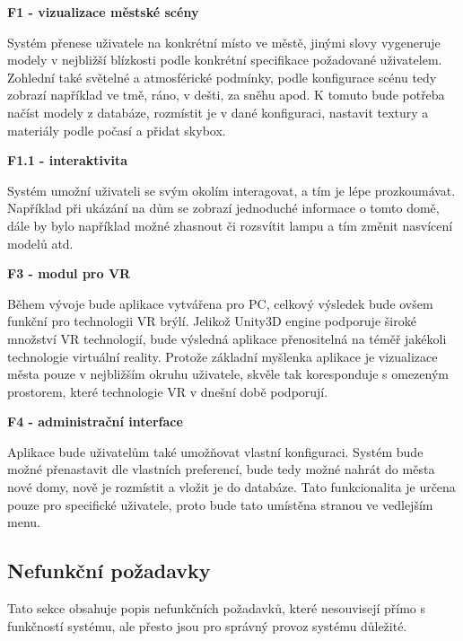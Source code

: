 \documentclass[thesis=B,czech]{FITthesis}[2012/06/26]
\begin{document}
	\begin{description}
	
 		\item \textbf{F1 - vizualizace městské scény}
 		 			
 			Systém přenese uživatele na konkrétní místo ve městě, jinými slovy vygeneruje modely v nejbližší blízkosti podle konkrétní specifikace požadované uživatelem. Zohlední také světelné a atmosférické podmínky, podle konfigurace scénu tedy zobrazí například ve tmě, ráno, v dešti, za sněhu apod. K tomuto bude potřeba načíst modely z databáze, rozmístit je v dané konfiguraci, nastavit textury a materiály podle počasí a přidat skybox.

 		\item \textbf{F1.1 - interaktivita}
 		
 		Systém umožní uživateli se svým okolím interagovat, a tím je lépe prozkoumávat. Například při ukázání na dům se zobrazí jednoduché informace o tomto domě, dále by bylo například možné zhasnout či rozsvítit lampu a tím změnit nasvícení modelů atd.
 		
 		\item \textbf{F3 - modul pro VR}
 		
 		Během vývoje bude aplikace vytvářena pro PC, celkový výsledek bude ovšem funkční pro technologii VR brýlí. Jelikož Unity3D engine podporuje široké množství VR technologií, bude výsledná aplikace přenositelná na téměř jakékoli technologie virtuální reality. Protože základní myšlenka aplikace je vizualizace města pouze v nejbližším okruhu uživatele, skvěle tak koresponduje s omezeným prostorem, které technologie VR v dnešní době podporují.
 		
 		\item \textbf{F4 - administrační interface}
 		
 		Aplikace bude uživatelům také umožňovat vlastní konfiguraci. Systém bude možné přenastavit dle vlastních preferencí, bude tedy možné nahrát do města nové domy, nově je rozmístit a vložit je do databáze. Tato funkcionalita je určena pouze pro specifické uživatele, proto bude tato umístěna stranou ve vedlejším menu.
 	\end{description}	
 		
\subsection{Nefunkční požadavky}	
	Tato sekce obsahuje popis nefunkčních požadavků, které nesouvisejí přímo s funkčností systému, ale přesto jsou pro správný provoz systému důležité.
			
\end{document}
